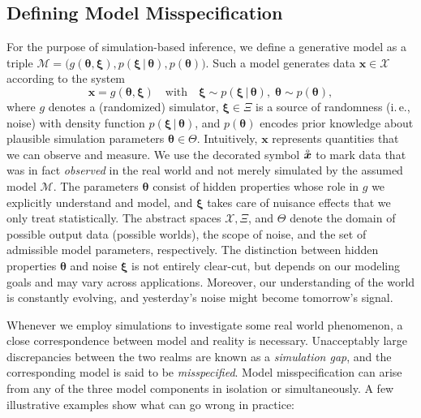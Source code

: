 \documentclass[twoside,11pt]{article}
\newcommand{\observed}[1]{\protect\accentset{\text{o}}{#1}}%
\newcommand{\x}{\boldsymbol{x}}
\newcommand{\xib}{\boldsymbol{\xi}}
\newcommand{\thetab}{\boldsymbol{\theta}}
\newcommand{\0}{\boldsymbol{0}}
\newcommand{\given}{\,|\,}
\newcommand{\prior}{p(\thetab)}
\newcommand{\noised}{p(\xib \given \thetab)}
\newcommand{\model}{g(\thetab, \xib)}
\newcommand{\M}{\mathcal{M}}
\newcommand{\ie}{i.\,e.}
\begin{document}
\subsection{Defining Model Misspecification}\label{sec:defining-model-misspecification}
For the purpose of simulation-based inference, we define a generative model as a triple $\mathcal{M} = \big( \model, \noised, \prior \big)$.
Such a model generates data $\x \in \mathcal{X}$ according to the system
\begin{equation}
    \x = \model \quad\textrm{with}\quad \xib \sim \noised,\; \thetab \sim \prior,
\end{equation}
where $g$ denotes a (randomized) simulator, $\xib \in \Xi$ is a source of randomness (\ie, noise) with density function $\noised$, and $\prior$ encodes prior knowledge about plausible simulation parameters $\thetab \in \Theta$.
Intuitively, $\x$ represents quantities that we can observe and measure.
We use the decorated symbol $\observed{\x}$ to mark data that was in fact \emph{observed} in the real world and not merely simulated by the assumed model $\M$.
The parameters $\thetab$ consist of hidden properties whose role in $g$ we explicitly understand and model, and $\xib$ takes care of nuisance effects that we only treat statistically.
The abstract spaces $\mathcal{X}, \Xi$, and $\Theta$ denote the domain of possible output data (possible worlds), the scope of noise, and the set of admissible model parameters, respectively.
The distinction between hidden properties $\thetab$ and noise $\xib$ is not entirely clear-cut, but depends on our modeling goals and may vary across applications.
Moreover, our understanding of the world is constantly evolving, and yesterday's noise might become tomorrow's signal.

Whenever we employ simulations to investigate some real world phenomenon, a close correspondence between model and reality is necessary. 
Unacceptably large discrepancies between the two realms are known as a \emph{simulation gap}, and the corresponding model is said to be \emph{misspecified}.
Model misspecification can arise from any of the three model components in isolation or simultaneously.
A few illustrative examples show what can go wrong in practice:
\end{document}
